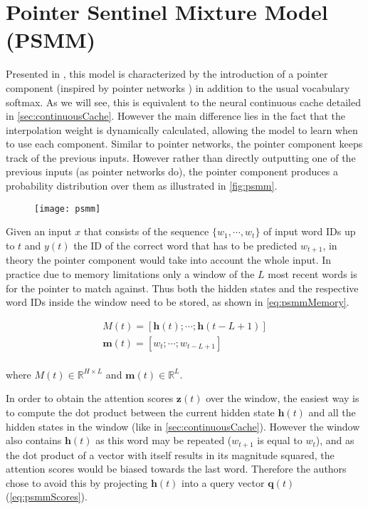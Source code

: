 \section{Pointer Sentinel Mixture Model (PSMM)}
\label{sec:pointerMixture}

Presented in \cite{merity2016pointer}, this model is characterized by the introduction of a pointer component (inspired by pointer networks \cite{vinyals2015pointer}) in addition to the usual vocabulary softmax. As we will see, this is equivalent to the neural continuous cache detailed in \autoref{sec:continuousCache}. However the main difference lies in the fact that the interpolation weight is dynamically calculated, allowing the model to learn when to use each component. Similar to pointer networks, the pointer component keeps track of the previous inputs. However rather than directly outputting one of the previous inputs (as pointer networks do), the pointer component produces a probability distribution over them as illustrated in \autoref{fig:psmm}.

\begin{figure}[H]
	\centering
	\texttt{[image: psmm]}
	\label{fig:psmm}
\end{figure}

Given an input $x$ that consists of the sequence $\{w_1, \cdots , w_t\}$ of input word IDs up to $t$ and $y(t)$ the ID of the correct word that has to be predicted $w_{t+1}$, in theory the pointer component would take into account the whole input. In practice due to memory limitations only a window of the $L$ most recent words is  for the pointer to match against. Thus both the hidden states and the respective word IDs inside the window need to be stored, as shown in \autoref{eq:psmmMemory}.

\begin{equation} \label{eq:psmmMemory}
	\begin{gathered}
		M(t) = [\mathbf{h}(t); \cdots; \mathbf{h}(t-L+1) ] \\
		\mathbf{m}(t) = [w_t; \cdots; w_{t-L+1}] \\
	\end{gathered}
\end{equation}

where $M(t) \in \mathbb{R}^{H \times L}$ and $\mathbf{m}(t) \in \mathbb{R}^{L}$. 

In order to obtain the attention scores $\mathbf{z}(t)$ over the window, the easiest way is to compute the dot product between the current hidden state $\mathbf{h}(t)$ and all the hidden states in the window (like in \autoref{sec:continuousCache}). However the window also contains $\mathbf{h}(t)$ as this word may be repeated ($w_{t+1}$ is equal to $w_t$), and as the dot product of a vector with itself results in its magnitude squared, the attention scores would be biased towards the last word. Therefore the authors chose to avoid this by projecting $\mathbf{h}(t)$ into a query vector $\mathbf{q}(t)$ (\autoref{eq:psmmScores}).

